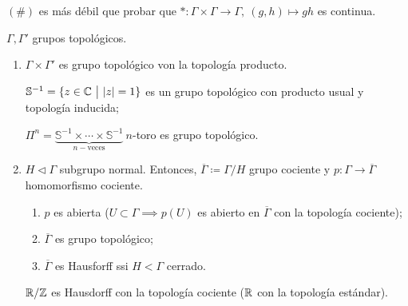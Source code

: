 \begin{observe}
	$(\#)$ es más débil que probar que $*: \Gamma \times \Gamma \to \Gamma,\ (g,h) \mapsto gh$ es continua.
\end{observe}

\begin{property}
	$\Gamma, \Gamma'$ grupos topológicos.
	\begin{enumerate}
		\item $\Gamma \times \Gamma'$ es grupo topológico von la topología producto.
		\begin{eg}[1.1]
			$\mathbb{S}^{-1} = \{z \in \mathbb{C} \ \big| \ |z| = 1 \}$ es un grupo topológico con producto usual y topología inducida;
		\end{eg}
		\begin{eg}[1.2]
			$\Pi^n = \underbrace{\mathbb{S}^{-1} \times \cdots \times \mathbb{S}^{-1}}_{n-\text{veces}}\ n$-toro es grupo topológico.
		\end{eg}

		\item $H \lhd \Gamma $ subgrupo normal. Entonces, $\overline{\Gamma} \coloneq \Gamma / H$ grupo cociente y $p: \Gamma \to \overline{\Gamma}$ homomorfismo cociente.
		\begin{enumerate}
			\item $p$ es abierta ($U \subset \Gamma \implies p(U)$ es abierto en $\overline{\Gamma}$ con la topología cociente);

			\item $\overline{\Gamma}$ es grupo topológico;

			\item $\overline{\Gamma}$ es Hausforff ssi $H < \Gamma$ cerrado.
		\end{enumerate}
		\begin{eg}[2.1]
			$\mathbb{R} / \mathbb{Z}$ es Hausdorff con la topología cociente ($\mathbb{R}$ con la topología estándar).
		\end{eg}
	\end{enumerate}
\end{property}
